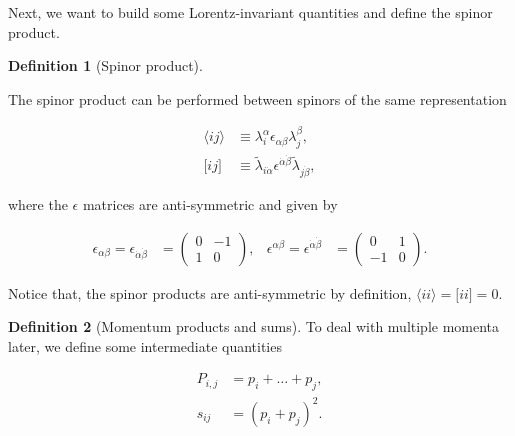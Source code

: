 \documentclass{article}
\theoremstyle{definition}
\newtheorem{definition}{Definition}[section]
\numberwithin{equation}{section}
\begin{document}
Next, we want to build some Lorentz-invariant quantities and define the spinor product.

\begin{definition}[Spinor product]
\label{def:spinor_product}

The spinor product can be performed between spinors of the same representation

\begin{align*}
    \langle ij \rangle &\equiv \lambda^{\alpha}_i \epsilon_{\alpha \beta} \lambda^{\beta}_j, \\
    \lbrack ij \rbrack &\equiv \tilde{\lambda}_{i \dot{\alpha}} \epsilon^{\dot{\alpha} \dot{\beta}} \tilde{\lambda}_{j \dot{\beta}},
\end{align*}

where the $\epsilon$ matrices are anti-symmetric and given by

\begin{align*}
    \epsilon_{\alpha \beta} = \epsilon_{\dot{\alpha} \dot{\beta}} &= \begin{pmatrix}0 & -1 \\ 1 & 0\end{pmatrix}, & \epsilon^{\alpha \beta} = \epsilon^{\dot{\alpha} \dot{\beta}} &= \begin{pmatrix}0 & 1 \\ -1 & 0\end{pmatrix}.
\end{align*}

Notice that, the spinor products are anti-symmetric by definition, $\langle ii \rangle = \lbrack ii \rbrack = 0$.

\end{definition}

\begin{definition}[Momentum products and sums]

To deal with multiple momenta later, we define some intermediate quantities

\begin{align}
     P_{i,j} &= p_i + \dots + p_j, \\
     s_{ij} &= \left( p_i + p_j \right)^2.
\end{align}

\end{definition}
\end{document}
